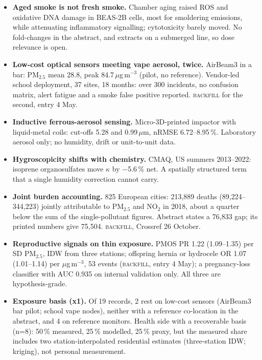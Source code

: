 \documentclass[10pt]{article}
\begin{document}
\footnotesize
\begin{itemize}

\item \textbf{Aged smoke is not fresh smoke.} Chamber aging raised ROS and oxidative DNA damage in BEAS-2B cells, most for smoldering emissions, while attenuating inflammatory signalling; cytotoxicity barely moved. No fold-changes in the abstract, and extracts on a submerged line, so dose relevance is open.

\item \textbf{Low-cost optical sensors meeting vape aerosol, twice.} AirBeam3 in a bar: PM$_{2.5}$ mean 28.8, peak 84.7\,$\mu$g\,m$^{-3}$ (pilot, no reference). Vendor-led school deployment, 37 sites, 18 months: over 300 incidents, no confusion matrix, alert fatigue and a smoke false positive reported. \textsc{backfill} for the second, entry 4 May.

\item \textbf{Inductive ferrous-aerosol sensing.} Micro-3D-printed impactor with liquid-metal coils: cut-offs 5.28 and 0.99\,$\mu$m, nRMSE 6.72--8.95\,\%. Laboratory aerosol only; no humidity, drift or unit-to-unit data.

\item \textbf{Hygroscopicity shifts with chemistry.} CMAQ, US summers 2013--2022: isoprene organosulfates move $\kappa$ by $-$5.6\,\% net. A spatially structured term that a single humidity correction cannot carry.

\item \textbf{Joint burden accounting.} 825 European cities: 213,889 deaths (89,224--344,223) jointly attributable to PM$_{2.5}$ and NO$_2$ in 2018, about a quarter below the sum of the single-pollutant figures. Abstract states a 76,833 gap; its printed numbers give 75,504. \textsc{backfill}, Crossref 26 October.

\item \textbf{Reproductive signals on thin exposure.} PMOS PR 1.22 (1.09--1.35) per SD PM$_{2.5}$, IDW from three stations; offspring hernia or hydrocele OR 1.07 (1.01--1.14) per $\mu$g\,m$^{-3}$, 53 events (\textsc{backfill}, entry 4 May); a pregnancy-loss classifier with AUC 0.935 on internal validation only. All three are hypothesis-grade.

\item \textbf{Exposure basis (x1).} Of 19 records, 2 rest on low-cost sensors (AirBeam3 bar pilot; school vape nodes), neither with a reference co-location in the abstract, and 4 on reference monitors. Health side with a recoverable basis (n=8): 50\,\% measured, 25\,\% modelled, 25\,\% proxy, but the measured share includes two station-interpolated residential estimates (three-station IDW; kriging), not personal measurement.

\end{itemize}
\end{document}
